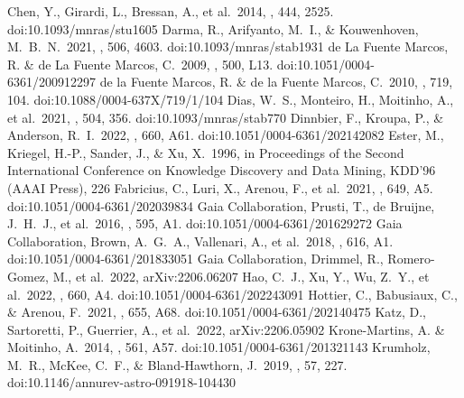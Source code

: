 \documentclass{aa} %
\begin{document}
\begin{thebibliography}{}
     Chen, Y., Girardi, L., Bressan, A., et al.\ 2014, \mnras, 444, 2525. doi:10.1093/mnras/stu1605
     Darma, R., Arifyanto, M.~I., \& Kouwenhoven, M.~B.~N.\ 2021, \mnras, 506, 4603. doi:10.1093/mnras/stab1931
     de La Fuente Marcos, R. \& de La Fuente Marcos, C.\ 2009, \aap, 500, L13. doi:10.1051/0004-6361/200912297
     de la Fuente Marcos, R. \& de la Fuente Marcos, C.\ 2010, \apj, 719, 104. doi:10.1088/0004-637X/719/1/104
     Dias, W.~S., Monteiro, H., Moitinho, A., et al.\ 2021, \mnras, 504, 356. doi:10.1093/mnras/stab770
     Dinnbier, F., Kroupa, P., \& Anderson, R.~I.\ 2022, \aap, 660, A61. doi:10.1051/0004-6361/202142082
     Ester, M., Kriegel, H.-P., Sander, J., \& Xu, X.\ 1996, in Proceedings of the Second International Conference on Knowledge Discovery and Data Mining, KDD’96 (AAAI Press), 226
     Fabricius, C., Luri, X., Arenou, F., et al.\ 2021, \aap, 649, A5. doi:10.1051/0004-6361/202039834
     Gaia Collaboration, Prusti, T., de Bruijne, J.~H.~J., et al.\ 2016, \aap, 595, A1. doi:10.1051/0004-6361/201629272
     Gaia Collaboration, Brown, A.~G.~A., Vallenari, A., et al.\ 2018, \aap, 616, A1. doi:10.1051/0004-6361/201833051
     Gaia Collaboration, Drimmel, R., Romero-Gomez, M., et al.\ 2022, arXiv:2206.06207
     Hao, C.~J., Xu, Y., Wu, Z.~Y., et al.\ 2022, \aap, 660, A4. doi:10.1051/0004-6361/202243091
     Hottier, C., Babusiaux, C., \& Arenou, F.\ 2021, \aap, 655, A68. doi:10.1051/0004-6361/202140475
     Katz, D., Sartoretti, P., Guerrier, A., et al.\ 2022, arXiv:2206.05902
     Krone-Martins, A. \& Moitinho, A.\ 2014, \aap, 561, A57. doi:10.1051/0004-6361/201321143
     Krumholz, M.~R., McKee, C.~F., \& Bland-Hawthorn, J.\ 2019, \araa, 57, 227. doi:10.1146/annurev-astro-091918-104430

\end{thebibliography}
\end{document}
